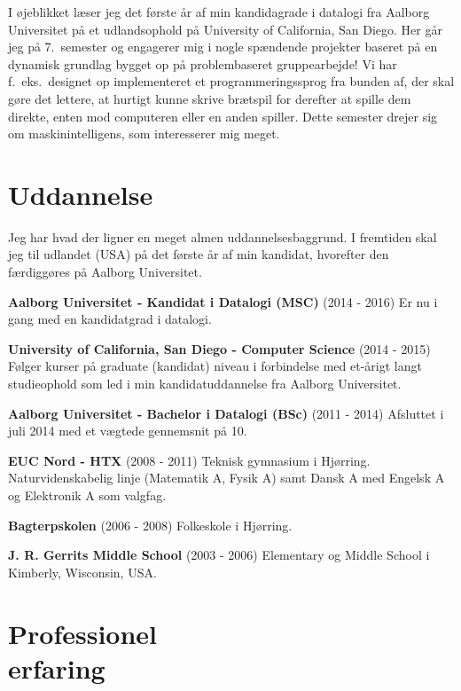 \documentclass[margin,line,a4paper]{resume}
\begin{document}
\begin{resume}
    I øjeblikket læser jeg det første år af min kandidagrade i datalogi
    fra Aalborg Universitet på et udlandsophold på University of
    California, San Diego. Her går jeg på 7.\ semester og engagerer mig
    i nogle spændende projekter baseret på en dynamisk grundlag bygget
    op på problembaseret gruppearbejde! Vi har f.\ eks.\ designet op
    implementeret et programmeringssprog fra bunden af, der skal gøre
    det lettere, at hurtigt kunne skrive brætspil for derefter at spille
    dem direkte, enten mod computeren eller en anden spiller. Dette
    semester drejer sig om maskinintelligens, som interesserer mig
    meget.

    \section{\mysidestyle Uddannelse}
    Jeg har hvad der ligner en meget almen uddannelsesbaggrund. I
    fremtiden skal jeg til udlandet (USA) på det første år af min
    kandidat, hvorefter den færdiggøres på Aalborg Universitet.

    \textbf{Aalborg Universitet - Kandidat i Datalogi (MSC)} (2014 -
    2016) Er nu i gang med en kandidatgrad i datalogi.

    \textbf{University of California, San Diego - Computer Science}
    (2014 - 2015) Følger kurser på graduate (kandidat) niveau
    i forbindelse med et-årigt langt studieophold som led i min
    kandidatuddannelse fra Aalborg Universitet.

    \textbf{Aalborg Universitet - Bachelor i Datalogi (BSc)}
      (2011 - 2014) Afsluttet i juli 2014 med et vægtede gennemsnit på
      10.

    \textbf{EUC Nord - HTX} (2008 - 2011) Teknisk gymnasium i Hjørring.
      Naturvidenskabelig linje (Matematik A, Fysik A) samt Dansk A med
      Engelsk A og Elektronik A som valgfag.

    \textbf{Bagterpskolen} (2006 - 2008) Folkeskole i Hjørring.

    \textbf{J. R. Gerrits Middle School} (2003 - 2006) Elementary og
      Middle School i Kimberly, Wisconsin, USA.

\section{\mysidestyle Professionel\\erfaring}\vspace{1mm}
\begin{description}


\end{description}
\end{resume}
\end{document}
